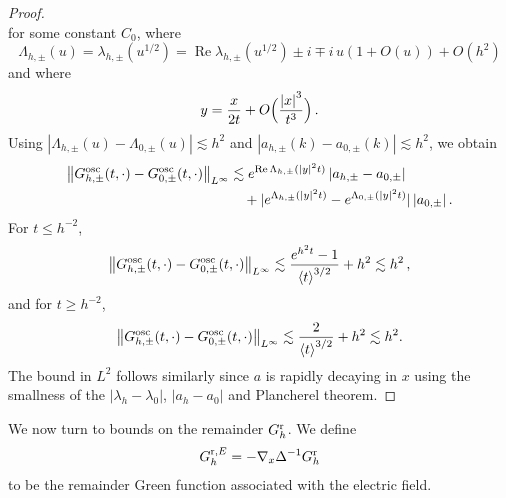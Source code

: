 \documentclass[a4paper,12pt]{amsart} %
\theoremstyle{plain}
\theoremstyle{definition}
\newcommand		{\lt}			{\left}				%
\newcommand		{\rt}			{\right}			%
\renewcommand	{\(}			{\lt(}
\renewcommand	{\)}			{\rt)}
\newcommand		{\bangle}[1]	{\lt\langle #1\rt\rangle}
\newcommand		{\weight}[1]	{\bangle{#1}}	%
\newcommand		{\n}[1]			{\lt\lvert{#1}\rt\rvert}	%
\newcommand		{\nrm}[1]		{\lt\lVert{#1}\rt\rVert}		%
\newcommand		{\Nrm}[2]		{\nrm{#1}_{#2}}
\DeclareMathOperator{\re}		{Re}				%
\newcommand	{\h}			{h}
\newcommand		{\Gr}			{G^{\textnormal{r}}}
\newcommand		{\GrE}			{G^{\textnormal{r},E}}
\newcommand		{\Gosc}			{G^{\textnormal{osc}}}
\begin{document}
\begin{proof}
\begin{equation*}
		\end{equation*}
		for some constant $C_0$, where
		\begin{equation*}
			\Lambda_{\h,\pm}(u) = \lambda_{\h,\pm}\!\lt(u^{1/2}\rt)
			= \re \lambda_{\h,\pm}\!\lt(u^{1/2}\rt) \pm i \mp i \, u \lt( 1+ O( u ) \rt) + O(h^2)
		\end{equation*}
		and where 
		\begin{equation*}
			y = \frac{x}{2 t} + O \Bigl( \frac{ \n{x}^3}{t^3} \Bigr) \, .
		\end{equation*}
		Using $\n{\Lambda_{\h,\pm}(u) - \Lambda_{0,\pm}(u)}\lesssim h^2$ and $\n{a_{\h,\pm}(k) - a_{0,\pm}(k)} \lesssim h^2$, we obtain
		\begin{align*}
			\Nrm{\Gosc_{\h,\pm}(t,\cdot) - \Gosc_{0,\pm}(t,\cdot)}{L^\infty}
			& \lesssim e^{\re \Lambda_{\h,\pm}(|y|^2 t)} \n{a_{\h,\pm}- a_{0,\pm}}
			\\
			& \quad + | e^{\Lambda_{\h,\pm}(|y|^2 t)} - e^{\Lambda_{0,\pm}(|y|^2 t)}| \n{a_{0,\pm}} .
		\end{align*}
		For $t \le h^{-2}$,
		\begin{equation*}
			\Nrm{\Gosc_{\h,\pm}(t,\cdot) - \Gosc_{0,\pm}(t,\cdot)}{L^\infty} \lesssim \frac{e^{h^2 t} -1}{\weight{t}^{3/2}} + h^2 \lesssim h^2 \, ,
		\end{equation*}
		and for $t \ge h^{-2}$, 
		\begin{equation*}
			\Nrm{\Gosc_{\h,\pm}(t,\cdot) - \Gosc_{0,\pm}(t,\cdot)}{L^\infty} \lesssim \frac{2}{\weight{t}^{3/2}} + h^2 \lesssim h^2 .
		\end{equation*}
		The bound in $L^2$ follows similarly since $a$ is rapidly decaying in $x$ using the smallness of the $\n{\lambda_\h-\lambda_0}$, $\n{a_\h-a_0}$ and Plancherel theorem. 
	\end{proof}

	We now turn to bounds on the remainder $\Gr_h$. We define
	\begin{equation*}
		\GrE_h = - \nabla_x \Delta^{-1} \Gr_h
	\end{equation*}
	to be the remainder Green function associated with the electric field.
	
\end{document}
